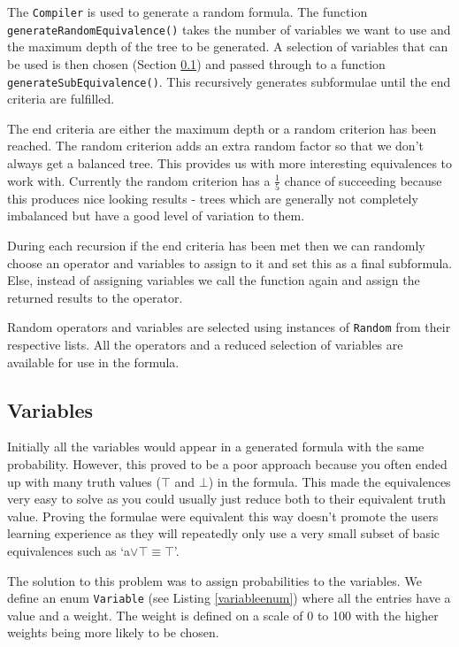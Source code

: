 \documentclass{report}
\begin{document}
The {\tt Compiler} is used to generate a random formula. The function {\tt generateRandomEquivalence()} takes the number of variables we want to use and the maximum depth of the tree to be generated. A selection of variables that can be used is then chosen (Section \ref{sub:variables}) and passed through to a function {\tt generateSubEquivalence()}. This recursively generates subformulae until the end criteria are fulfilled.

The end criteria are either the maximum depth or a random criterion has been reached. The random criterion adds an extra random factor so that we don't always get a balanced tree. This provides us with more interesting equivalences to work with. Currently the random criterion has a $\frac{1}{5}$ chance of succeeding because this produces nice looking results - trees which are generally not completely imbalanced but have a good level of variation to them. 

During each recursion if the end criteria has been met then we can randomly choose an operator and variables to assign to it and set this as a final subformula. Else, instead of assigning variables we call the function again and assign the returned results to the operator.

Random operators and variables are selected using instances of {\tt Random} from their respective lists. All the operators and a reduced selection of variables are available for use in the formula.

\subsection{Variables}
\label{sub:variables}

Initially all the variables would appear in a generated formula with the same probability. However, this proved to be a poor approach because you often ended up with many truth values ($\top$ and $\bot$) in the formula. This made the equivalences very easy to solve as you could usually just reduce both to their equivalent truth value. Proving the formulae were equivalent this way doesn't promote the users learning experience as they will repeatedly only use a very small subset of basic equivalences such as `a$\lor\top \equiv \top$'.

The solution to this problem was to assign probabilities to the variables. We define an enum {\tt Variable} (see Listing \ref{variableenum}) where all the entries have a value and a weight. The weight is defined on a scale of 0 to 100 with the higher weights being more likely to be chosen.
\end{document}

